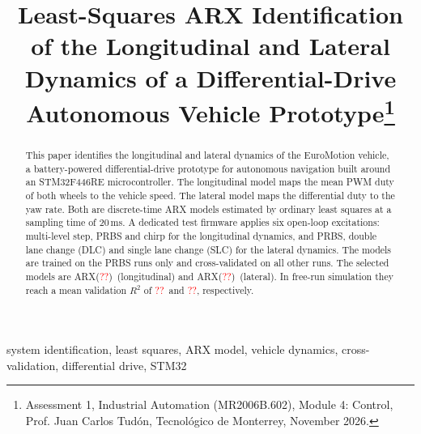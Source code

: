 \documentclass[conference]{IEEEtran}
\newcommand{\NA}{\textcolor{red}{??}}
\newcommand{\LonOrder}{ARX(\NA)}  \newcommand{\LatOrder}{ARX(\NA)}
\newcommand{\LonRval}{\NA}   \newcommand{\LatRval}{\NA}
\begin{document}
\title{Least-Squares ARX Identification of the Longitudinal and Lateral
Dynamics of a Differential-Drive Autonomous Vehicle Prototype\thanks{Assessment 1,
Industrial Automation (MR2006B.602), Module 4: Control, Prof. Juan Carlos Tud\'on,
Tecnol\'ogico de Monterrey, November 2026.}}

\author{
\and
{}
\and
{}
\and
{}
}

\maketitle

\begin{abstract}
This paper identifies the longitudinal and lateral dynamics of the
EuroMotion vehicle, a battery-powered differential-drive prototype for
autonomous navigation built around an STM32F446RE microcontroller.
The longitudinal model maps the mean PWM duty of both wheels to the
vehicle speed. The lateral model maps the differential duty to the yaw
rate. Both are discrete-time ARX models estimated by ordinary least
squares at a sampling time of 20\,ms. A dedicated test firmware applies
six open-loop excitations: multi-level step, PRBS and chirp for the
longitudinal dynamics, and PRBS, double lane change (DLC) and single lane
change (SLC) for the lateral dynamics. The models are trained on the PRBS
runs only and cross-validated on all other runs. The selected models are
\LonOrder\ (longitudinal) and \LatOrder\ (lateral). In free-run simulation
they reach a mean validation $R^2$ of \LonRval\ and \LatRval, respectively.
\end{abstract}

\begin{IEEEkeywords}
system identification, least squares, ARX model, vehicle dynamics,
cross-validation, differential drive, STM32
\end{IEEEkeywords}
\end{document}
